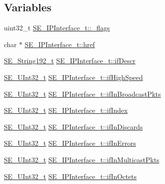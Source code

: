 \subsection*{Variables}
\begin{DoxyCompactItemize}
\item 
uint32\+\_\+t \hyperlink{group__IPInterface_gace4102e6c256f2507297836fe17fff28}{S\+E\+\_\+\+I\+P\+Interface\+\_\+t\+::\+\_\+flags}
\item 
char $\ast$ \hyperlink{group__IPInterface_ga063592c47cab686db07cef148ff02329}{S\+E\+\_\+\+I\+P\+Interface\+\_\+t\+::href}
\item 
\hyperlink{group__String192_ga25f61da2bbbdfe30dbf77fcbb7edd7d7}{S\+E\+\_\+\+String192\+\_\+t} \hyperlink{group__IPInterface_gaec54566a9473364a58578a49f9002bbf}{S\+E\+\_\+\+I\+P\+Interface\+\_\+t\+::if\+Descr}
\item 
\hyperlink{group__UInt32_ga70bd4ecda3c0c85d20779d685a270cdb}{S\+E\+\_\+\+U\+Int32\+\_\+t} \hyperlink{group__IPInterface_ga9c845cec5282d48c7af1f5abb0aed20c}{S\+E\+\_\+\+I\+P\+Interface\+\_\+t\+::if\+High\+Speed}
\item 
\hyperlink{group__UInt32_ga70bd4ecda3c0c85d20779d685a270cdb}{S\+E\+\_\+\+U\+Int32\+\_\+t} \hyperlink{group__IPInterface_gad538e5107f8d10a4363da4032e1f9b33}{S\+E\+\_\+\+I\+P\+Interface\+\_\+t\+::if\+In\+Broadcast\+Pkts}
\item 
\hyperlink{group__UInt32_ga70bd4ecda3c0c85d20779d685a270cdb}{S\+E\+\_\+\+U\+Int32\+\_\+t} \hyperlink{group__IPInterface_gafa7cb533b5151c2ec6530e1eeafddb4d}{S\+E\+\_\+\+I\+P\+Interface\+\_\+t\+::if\+Index}
\item 
\hyperlink{group__UInt32_ga70bd4ecda3c0c85d20779d685a270cdb}{S\+E\+\_\+\+U\+Int32\+\_\+t} \hyperlink{group__IPInterface_gaad6f4c9d559ab327e99768bf5c8ec5be}{S\+E\+\_\+\+I\+P\+Interface\+\_\+t\+::if\+In\+Discards}
\item 
\hyperlink{group__UInt32_ga70bd4ecda3c0c85d20779d685a270cdb}{S\+E\+\_\+\+U\+Int32\+\_\+t} \hyperlink{group__IPInterface_gadd01660d9eaa51e1d1eb964318265e00}{S\+E\+\_\+\+I\+P\+Interface\+\_\+t\+::if\+In\+Errors}
\item 
\hyperlink{group__UInt32_ga70bd4ecda3c0c85d20779d685a270cdb}{S\+E\+\_\+\+U\+Int32\+\_\+t} \hyperlink{group__IPInterface_ga010a8b6fd224af2ba1a415170fa49a23}{S\+E\+\_\+\+I\+P\+Interface\+\_\+t\+::if\+In\+Multicast\+Pkts}
\item 
\hyperlink{group__UInt32_ga70bd4ecda3c0c85d20779d685a270cdb}{S\+E\+\_\+\+U\+Int32\+\_\+t} \hyperlink{group__IPInterface_ga52f2ce48f9f8e449c479cc9a9e548c93}{S\+E\+\_\+\+I\+P\+Interface\+\_\+t\+::if\+In\+Octets}

\end{DoxyCompactItemize}
